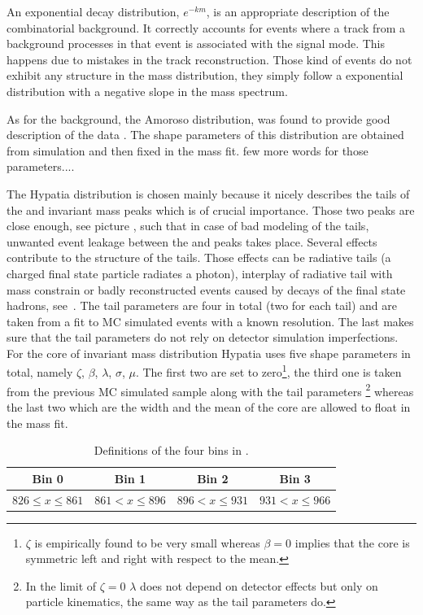 \noindent An exponential decay distribution, $e^{-km}$, is an appropriate description of the combinatorial background. It correctly accounts for events where
a track from a background processes in that event is associated with the signal mode. This happens due to mistakes in the track reconstruction.
Those kind of events do not exhibit any structure in the mass distribution, they simply follow a exponential distribution with a negative slope in the mass spectrum. 

As for the \LbJpsippi background, the Amoroso distribution, was found to provide good description of the data . 
The shape parameters of this distribution are obtained from simulation and then fixed in the mass fit. {\color{red} few more words for those parameters....}

The Hypatia distribution is chosen mainly because it nicely describes the tails of the \Bs and \Bd invariant mass peaks which is
of crucial importance. Those two peaks are close enough,
see picture , such that in case of bad modeling of the tails, unwanted event leakage between the \Bs and \Bd peaks 
takes place. Several effects contribute to the structure of the tails. Those effects can be radiative tails (a charged final state 
particle radiates a photon), interplay of radiative tail with \Jpsi mass constrain or badly reconstructed events caused by decays 
of the final state hadrons, see~\cite{Santos:2013gra}. The tail parameters are four in total (two for each tail) and are taken
from a fit to MC simulated events with a known resolution. The last makes sure that the tail parameters do not rely on detector 
simulation imperfections. For the core of invariant mass distribution Hypatia uses five shape parameters in total, namely $\zeta$, 
$\beta$, $\lambda$, $\sigma$, $\mu$. The first two are set to zero\footnote{$\zeta$ is empirically found to be very small whereas
$\beta = 0$ implies that the core is symmetric left and right with respect to the mean.}, the third one is taken from the previous
MC simulated sample along with the tail parameters \footnote{In the limit of $\zeta = 0$ $\lambda$ does not depend on detector 
effects but only on particle kinematics, the same way as the tail parameters do.} whereas the last two which are the width and 
the mean of the core are allowed to float in the mass fit.

\begin{table}[!h]
\centering
\begin{tabular}{c|c|c|c}
\hline
 Bin 0 & Bin 1 & Bin 2 & Bin 3\\	
\hline
\multirow{2}{*}{$ 826 \leq x \leq 861 $} & \multirow{2}{*}{$ 861 < x \leq 896 $} & \multirow{2}{*}{$ 896 < x \leq 931 $}& \multirow{2}{*}{$ 931 < x \leq 966 $} \\
					      	 					  &   &	& \\	
\hline
 \end{tabular}
\caption{Definitions of the four \mkpi bins in \mevcc.}
\label{Kbindef}
\end{table}


